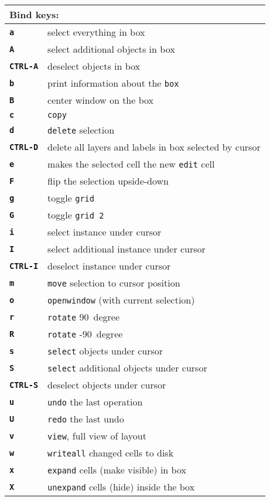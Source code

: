\documentclass[10pt,a4paper]{article}
\newcommand{\key}[1]{\texttt{\textbf{#1}}}
\newcommand{\mac}[1]{\texttt{#1}}
\begin{document}
	\newpage

	\begin{tabular}{p{}p{}}
		\toprule
		\multicolumn{2}{l}{Bind keys:}\\
		\midrule
		\key{a} & select everything in box\\
		\key{A} & select additional objects in box\\
		\key{CTRL-A} & deselect objects in box\\
		\key{b} & print information about the \mac{box}\\
		\key{B} & center window on the box\\
		\key{c} & \mac{copy}\\
		\key{d} & \mac{delete} selection\\
		\key{CTRL-D} & delete all layers and labels in box selected by cursor\\
		\key{e} & makes the selected cell the new \mac{edit} cell\\
		\key{F} & flip the selection upside-down\\
		\key{g} & toggle \mac{grid}\\
		\key{G} & toggle \mac{grid 2}\\
		\key{i} & select instance under cursor\\
		\key{I} & select additional instance under cursor\\
		\key{CTRL-I} & deselect instance under cursor\\
		\key{m} & \mac{move} selection to cursor position\\
		\key{o} & \mac{openwindow} (with current selection)\\
		\key{r} & \mac{rotate} 90~degree\\
		\key{R} & \mac{rotate} -90~degree\\
		\key{s} & \mac{select} objects under cursor\\
		\key{S} & \mac{select} additional objects under cursor\\
		\key{CTRL-S} & deselect objects under cursor\\
		\key{u} & \mac{undo} the last operation\\
		\key{U} & \mac{redo} the last undo\\
		\key{v} & \mac{view}, full view of layout\\
		\key{w} & \mac{writeall} changed cells to disk\\
		\key{x} & \mac{expand} cells (make visible) in box\\
		\key{X} & \mac{unexpand} cells (hide) inside the box\\

\end{tabular}
\end{document}
